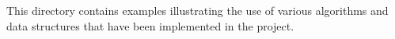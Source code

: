 This directory contains examples illustrating the use of various algorithms and data structures that have been implemented in the project. 